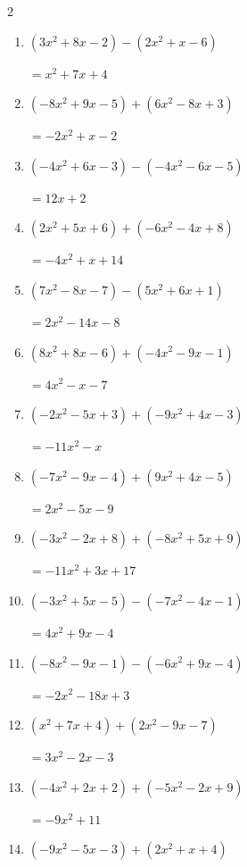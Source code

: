 \begin{multicols}{2}
\begin{enumerate}
  \item $(3x^{2}+8x-2)-(2x^{2}+x-6)$

        $=x^{2}+7x+4$

  \item $(-8x^{2}+9x-5)+(6x^{2}-8x+3)$

        $=-2x^{2}+x-2$

  \item $(-4x^{2}+6x-3)-(-4x^{2}-6x-5)$

        $=12x+2$

  \item $(2x^{2}+5x+6)+(-6x^{2}-4x+8)$

        $=-4x^{2}+x+14$

  \item $(7x^{2}-8x-7)-(5x^{2}+6x+1)$

        $=2x^{2}-14x-8$

  \item $(8x^{2}+8x-6)+(-4x^{2}-9x-1)$

        $=4x^{2}-x-7$

  \item $(-2x^{2}-5x+3)+(-9x^{2}+4x-3)$

        $=-11x^{2}-x$

  \item $(-7x^{2}-9x-4)+(9x^{2}+4x-5)$

        $=2x^{2}-5x-9$

\columnbreak %

\resetques

  \item $(-3x^{2}-2x+8)+(-8x^{2}+5x+9)$

        $=-11x^{2}+3x+17$

  \item $(-3x^{2}+5x-5)-(-7x^{2}-4x-1)$

        $=4x^{2}+9x-4$

  \item $(-8x^{2}-9x-1)-(-6x^{2}+9x-4)$

        $=-2x^{2}-18x+3$

  \item $(x^{2}+7x+4)+(2x^{2}-9x-7)$

        $=3x^{2}-2x-3$

  \item $(-4x^{2}+2x+2)+(-5x^{2}-2x+9)$

        $=-9x^{2}+11$

  \item $(-9x^{2}-5x-3)+(2x^{2}+x+4)$


\end{enumerate}
\end{multicols}
